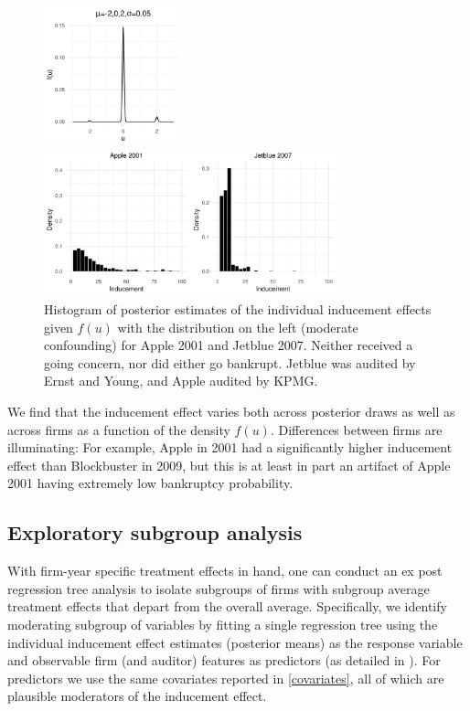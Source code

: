 \documentclass[aoas,preprint, 11pt, dvipsnames, table, x11name]{imsart}
\theoremstyle{remark}
\begin{document}
\begin{figure}[h]
	\centering	\begin{minipage}{.3\textwidth}
		\includegraphics[width=4cm]{rightbump2}
	\end{minipage}%
	\begin{minipage}{.5\textwidth}
		
		\includegraphics[width=8.5cm]{Apple_jetblue_right_RR}
	\end{minipage}
	\caption[Apple vs Jetblue]{Histogram of posterior estimates of the individual inducement effects given $f(u)$ with the distribution on the left (moderate confounding) for Apple 2001 and Jetblue 2007.  Neither received a going concern, nor did either go bankrupt.  Jetblue was audited by Ernst and Young, and Apple audited by KPMG.} 
	\label{individ_firm_plot}
\end{figure}
We find that the inducement effect varies both across posterior draws as well as across firms as a function of the density $f(u)$.  Differences between firms are illuminating: For example, Apple in 2001 had a significantly higher inducement effect than Blockbuster in 2009, but this is at least in part an artifact of Apple 2001 having extremely low bankruptcy probability.

\subsection{Exploratory subgroup analysis}\label{4.5} 
With firm-year specific treatment effects in hand, one can conduct an ex post regression tree analysis to isolate subgroups of firms with subgroup average treatment effects that depart from the overall average.
Specifically, we identify moderating subgroup of variables by fitting a single regression tree using the individual inducement effect estimates (posterior means) as the response variable and observable firm (and auditor) features as predictors (as detailed in \cite{bcffreak}).   For predictors we use the same covariates reported in \ref{covariates}, all of which are plausible moderators of the inducement effect.  
\end{document}
